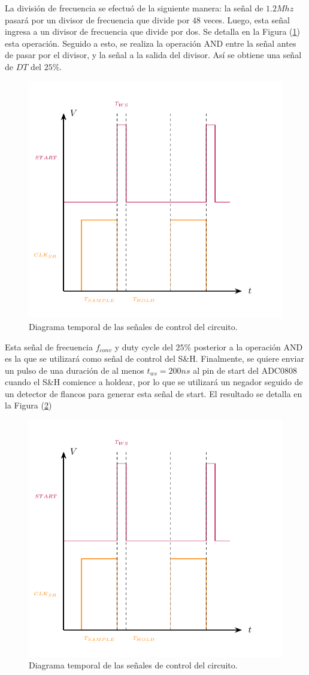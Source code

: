 La división de frecuencia se efectuó de la siguiente manera: la señal de $1.2Mhz$ pasará por un divisor de frecuencia que divide por $48$ veces. Luego, esta señal ingresa a un divisor de frecuencia que divide por dos. Se detalla en la Figura (\ref{DT}) esta operación. Seguido a esto, se realiza la operación AND entre la señal antes de pasar por el divisor, y la señal a la salida del divisor. Así se obtiene una señal de $DT$ del $25\%$.

\begin{figure}[H]
\centering
\includegraphics[width=0.7\linewidth, page = 2]{ImagenesEjercicio1/Graficos.pdf}
\caption{Diagrama temporal de las señales de control del circuito.}
\label{DT}
\end{figure}

Esta señal de frecuencia $f_{conv}$ y duty cycle del $25\%$ posterior a la operación AND es la que se utilizará como señal de control del S\&H. Finalmente, se quiere enviar un pulso de una duración de al menos $t_{ws} = 200ns$ al pin de start del ADC0808 cuando el S\&H comience a holdear, por lo que se utilizará un negador seguido de un detector de flancos para generar esta señal de start. El resultado se detalla en la Figura (\ref{START})

\begin{figure}[H]
\centering
\includegraphics[width=0.6\linewidth]{ImagenesEjercicio1/Graficos.pdf}
\caption{Diagrama temporal de las señales de control del circuito.}
\label{START}
\end{figure}

